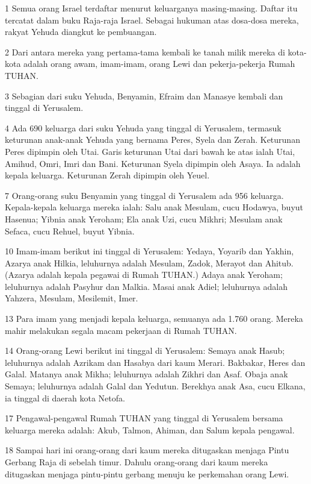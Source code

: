 \par 1 Semua orang Israel terdaftar menurut keluarganya masing-masing. Daftar itu tercatat dalam buku Raja-raja Israel. Sebagai hukuman atas dosa-dosa mereka, rakyat Yehuda diangkut ke pembuangan.
\par 2 Dari antara mereka yang pertama-tama kembali ke tanah milik mereka di kota-kota adalah orang awam, imam-imam, orang Lewi dan pekerja-pekerja Rumah TUHAN.
\par 3 Sebagian dari suku Yehuda, Benyamin, Efraim dan Manasye kembali dan tinggal di Yerusalem.
\par 4 Ada 690 keluarga dari suku Yehuda yang tinggal di Yerusalem, termasuk keturunan anak-anak Yehuda yang bernama Peres, Syela dan Zerah. Keturunan Peres dipimpin oleh Utai. Garis keturunan Utai dari bawah ke atas ialah Utai, Amihud, Omri, Imri dan Bani. Keturunan Syela dipimpin oleh Asaya. Ia adalah kepala keluarga. Keturunan Zerah dipimpin oleh Yeuel.
\par 7 Orang-orang suku Benyamin yang tinggal di Yerusalem ada 956 keluarga. Kepala-kepala keluarga mereka ialah: Salu anak Mesulam, cucu Hodawya, buyut Hasenua; Yibnia anak Yeroham; Ela anak Uzi, cucu Mikhri; Mesulam anak Sefaca, cucu Rehuel, buyut Yibnia.
\par 10 Imam-imam berikut ini tinggal di Yerusalem: Yedaya, Yoyarib dan Yakhin, Azarya anak Hilkia, leluhurnya adalah Mesulam, Zadok, Merayot dan Ahitub. (Azarya adalah kepala pegawai di Rumah TUHAN.) Adaya anak Yeroham; leluhurnya adalah Pasyhur dan Malkia. Masai anak Adiel; leluhurnya adalah Yahzera, Mesulam, Mesilemit, Imer.
\par 13 Para imam yang menjadi kepala keluarga, semuanya ada 1.760 orang. Mereka mahir melakukan segala macam pekerjaan di Rumah TUHAN.
\par 14 Orang-orang Lewi berikut ini tinggal di Yerusalem: Semaya anak Hasub; leluhurnya adalah Azrikam dan Hasabya dari kaum Merari. Bakbakar, Heres dan Galal. Matanya anak Mikha; leluhurnya adalah Zikhri dan Asaf. Obaja anak Semaya; leluhurnya adalah Galal dan Yedutun. Berekhya anak Asa, cucu Elkana, ia tinggal di daerah kota Netofa.
\par 17 Pengawal-pengawal Rumah TUHAN yang tinggal di Yerusalem bersama keluarga mereka adalah: Akub, Talmon, Ahiman, dan Salum kepala pengawal.
\par 18 Sampai hari ini orang-orang dari kaum mereka ditugaskan menjaga Pintu Gerbang Raja di sebelah timur. Dahulu orang-orang dari kaum mereka ditugaskan menjaga pintu-pintu gerbang menuju ke perkemahan orang Lewi.
